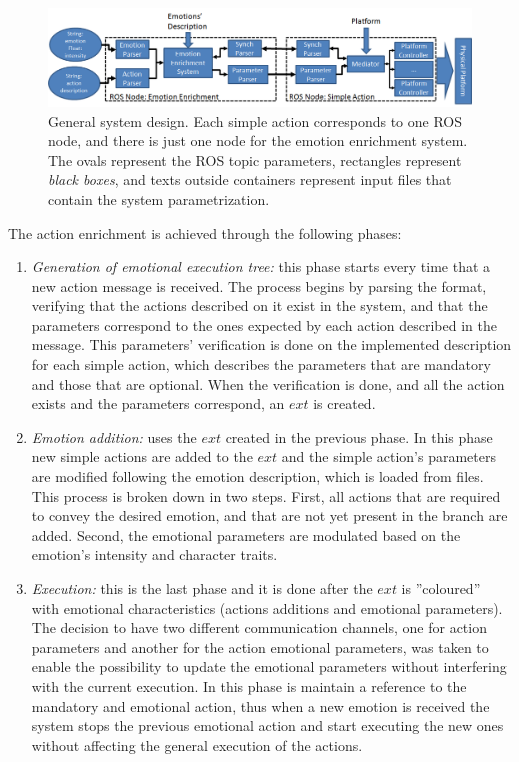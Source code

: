 \begin{figure}
	\centering
	\includegraphics[width=1.0\textwidth]{Images/SystemArchitecture.png} 	
	\caption{General system design. Each simple action corresponds to one ROS node, and there is just one node for the emotion enrichment system. The ovals represent the ROS topic parameters, rectangles represent \textit{black boxes}, and texts outside containers represent input files that contain the system parametrization.}
	\label{fig:system_architecture}
\end{figure}

The action enrichment is achieved through the following phases:
\begin{enumerate}

	\item \textit{Generation of emotional execution tree:} this phase starts every time that a new action message is received. The process begins by parsing the format, verifying that the actions described on it exist in the system, and that the parameters correspond to the ones expected by each action described in the message. This parameters' verification is done on the implemented description for each simple action, which describes the parameters that are mandatory and those that are optional. When the verification is done, and all the action exists and  the parameters correspond, an $ext$ is created.

	\item \textit{Emotion addition:} uses the $ext$ created in the previous phase. In this phase new simple actions are added to the $ext$ and the simple action's parameters are modified following the emotion description, which is loaded from files. This process is broken down in two steps. First, all actions that are required to convey the desired emotion, and that are not yet present in the branch are added. Second, the emotional parameters are modulated based on the emotion's intensity and character traits.

	\item \textit{Execution:} this is the last phase and it is done after the $ext$ is ''coloured'' with emotional characteristics (actions additions and emotional parameters). The decision to have two different communication channels, one for action parameters and another for the action emotional parameters, was taken to enable the possibility to update the emotional parameters without interfering with the current execution. In this phase is maintain a reference to the mandatory and emotional action, thus when a new emotion is received the system stops the previous emotional action and start executing the new ones without affecting the general execution of the actions.

\end{enumerate}